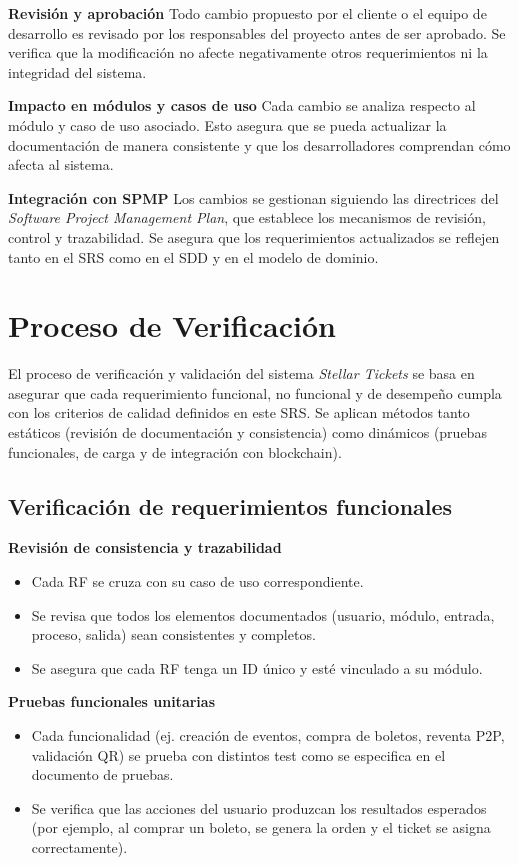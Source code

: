 \documentclass[12pt,letterpaper]{article}
\begin{document}
\textbf{Revisión y aprobación}  
Todo cambio propuesto por el cliente o el equipo de desarrollo es revisado por
los responsables del proyecto antes de ser aprobado. Se verifica que la
modificación no afecte negativamente otros requerimientos ni la integridad
del sistema.

\textbf{Impacto en módulos y casos de uso}  
Cada cambio se analiza respecto al módulo y caso de uso asociado. Esto asegura
que se pueda actualizar la documentación de manera consistente y que los
desarrolladores comprendan cómo afecta al sistema.

\textbf{Integración con SPMP}  
Los cambios se gestionan siguiendo las directrices del \textit{Software Project
Management Plan}, que establece los mecanismos de revisión, control y
trazabilidad. Se asegura que los requerimientos actualizados se reflejen tanto
en el SRS como en el SDD y en el modelo de dominio.

\section{Proceso de Verificación}

El proceso de verificación y validación del sistema \textit{Stellar Tickets} se
basa en asegurar que cada requerimiento funcional, no funcional y de desempeño
cumpla con los criterios de calidad definidos en este SRS. Se aplican métodos
tanto estáticos (revisión de documentación y consistencia) como dinámicos
(pruebas funcionales, de carga y de integración con blockchain).

\subsection{Verificación de requerimientos funcionales}

\textbf{Revisión de consistencia y trazabilidad}  
\begin{itemize}
    \item Cada RF se cruza con su caso de uso correspondiente.
    \item Se revisa que todos los elementos documentados (usuario, módulo, entrada,
    proceso, salida) sean consistentes y completos.
    \item Se asegura que cada RF tenga un ID único y esté vinculado a su módulo.
\end{itemize}

\textbf{Pruebas funcionales unitarias}  
\begin{itemize}
    \item Cada funcionalidad (ej. creación de eventos, compra de boletos, reventa P2P,
    validación QR) se prueba con distintos test como se especifica en el documento
    de pruebas.
    \item Se verifica que las acciones del usuario produzcan los resultados esperados
    (por ejemplo, al comprar un boleto, se genera la orden y el ticket se asigna
    correctamente).
\end{itemize}
\end{document}
